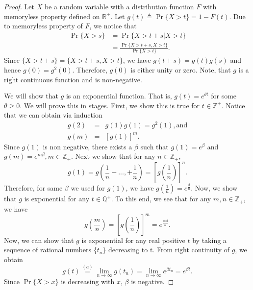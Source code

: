 \documentclass[a4paper,10pt,english]{article}
\begin{document}
\begin{proof}
Let $X$ be a random variable with a distribution function $F$ with memoryless property defined on $\mathbb{R}^{+}$. Let $g(t) \triangleq \Pr\{X > t\} = 1 - F(t)$. Due to memoryless property of $F$, we notice that
\begin{align*}
  \Pr\{X>s\} &= \Pr\{ X > t+s| X>t\} \\&= \frac{ \Pr\{ X>t+s, X>t\}}{\Pr\{X>t\}}.
\end{align*}
Since $\{X > t + s\} =\{ X>t+s, X>t\}$, we have $g(t+s) = g(t)g(s)$ and hence $g(0) = g^2(0)$. Therefore, $g(0)$ is either unity or zero. Note, that $g$ is a right continuous function and is non-negative. 

We will show that $g$ is an exponential function. That is, $g(t) = e^{\theta t}$ for some $\theta \geqslant 0$. We will prove this in stages. First, we show this is true for $t \in \mathbb{Z}^+$. Notice that we can obtain via induction
\begin{eqnarray*}
	g(2) &=& g(1) g(1) = g^{2}(1), \mathrm{ and }\\
	g(m) &=& [g(1)]^{m}.
\end{eqnarray*}
Since $g(1)$ is non negative, there exists a $\beta$ such that $g(1)=e^{\beta}$ and $g(m)= e^{m \beta}, m \in \mathbb{Z}_{+}$. Next we show that for any $n \in \mathbb{Z}_{+}$,        
\begin{equation*}
	g(1) =  g\left(\frac{1}{n}+..., +\frac{1}{n}\right) = \left[g\left(\frac{1}{n}\right)\right]^{n}.
\end{equation*}
Therefore, for same $\beta$ we used for $g(1)$, we have $g\left(\frac{1}{n}\right) = e^{\frac{\beta}{n}}$. Now, we show that $g$ is exponential for any $t \in \mathbb{Q}^+$. To this end, we see that for any $m, n \in \mathbb{Z}_{+}$, we have 
\begin{equation*}
	g\left(\frac{m}{n}\right) = \left[g\left(\frac{1}{n}\right)\right]^{m}= e^{\frac{m \beta}{n}}.
\end{equation*}
Now, we can show that $g$ is exponential for any real positive $t$ by taking a sequence of rational numbers $\{t_n\}$ decreasing to t. From right continuity of $g$, we obtain 
\begin{equation*}
	g(t) \stackrel{(a)}{=} \lim_{n\rightarrow \infty} g(t_n) =   \lim_{n\rightarrow \infty} e^{\beta t_{n}}= e^{\beta t}.
\end{equation*}
Since $\Pr\{X > x\}$  is decreasing  with $x$, $\beta $ is negative.  
\end{proof}
\end{document}
